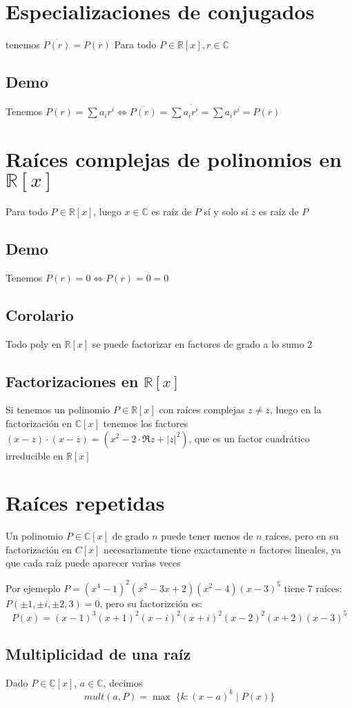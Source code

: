 \documentclass{article}
\def\R{\mathbb{R}}
\def\C{\mathbb{C}}
\begin{document}
\section{Especializaciones de conjugados}
tenemos \(
\overline{P(r)} = P(\overline{r})
\)
Para todo $P \in \R[x], r\in \C$
\subsection{Demo}
Tenemos \(
P(r) = \sum a_ir^i
\iff
\overline{P(r)} = \sum \overline{a_ir^i} = \sum a_i\overline{r}^i =
P(\overline{r})
\)
\section{Raíces complejas de polinomios en $\R[x]$}
Para todo $P \in \R[x]$, luego $x \in \C$ es raíz de $P$ sí y solo sí
$\overline{z}$ es raíz de $P$
\subsection{Demo}
Tenemos $P(r) = 0 \iff P(\overline{r}) = \overline{0} = 0$
\subsection{Corolario}
Todo poly en $\R[x]$ se puede factorizar en factores de grado a lo sumo $2$
\subsection{Factorizaciones en $\R[x]$}
Si tenemos un polinomio $P \in \R[x]$ con raíces complejas $z \neq
\overline{z}$, luego en la factorización en $\C[x]$ tenemos los factores \(
(x - z)\cdot (x - \overline{z}) = (x^2 - 2\cdot \Re z + |z|^2)
\), que es un factor cuadrático irreducible en $\R[x]$

\section{Raíces repetidas}
Un polinomio $P \in \C[x]$ de grado $n$ puede tener menos de $n$ raíces,
pero en su factorización en $C[x]$ necesariamente tiene exactamente
$n$ factores lineales, ya que cada raíz puede aparecer varias veces

Por ejemeplo $P = (x^4 - 1)^2(x^2 - 3x + 2)(x^2-4)(x-3)^5$ tiene $7$ raíces:
$P(\pm 1, \pm i, \pm 2, 3) = 0$, pero su factorizción es: \[P(x) =
(x-1)^3(x+1)^2(x-i)^2(x+i)^2(x-2)^2(x+2)(x-3)^5\]

\subsection{Multiplicidad de una raíz}
Dado $P \in \C[x]$, $a\in \C$, decimos
\[mult(a, P) = \max \; \{k : (x-a)^k \mid P(x)\}\]
\end{document}
